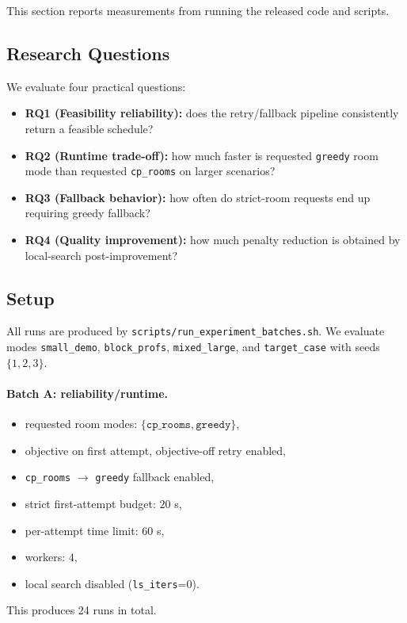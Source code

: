This section reports measurements from running the released code and scripts.

\subsection{Research Questions}
We evaluate four practical questions:
\begin{itemize}[leftmargin=*]
  \item \textbf{RQ1 (Feasibility reliability):} does the retry/fallback pipeline consistently return a feasible schedule?
  \item \textbf{RQ2 (Runtime trade-off):} how much faster is requested \texttt{greedy} room mode than requested \texttt{cp\_rooms} on larger scenarios?
  \item \textbf{RQ3 (Fallback behavior):} how often do strict-room requests end up requiring greedy fallback?
  \item \textbf{RQ4 (Quality improvement):} how much penalty reduction is obtained by local-search post-improvement?
\end{itemize}

\subsection{Setup}
All runs are produced by \texttt{scripts/run\_experiment\_batches.sh}.
We evaluate modes \texttt{small\_demo}, \texttt{block\_profs}, \texttt{mixed\_large}, and \texttt{target\_case}
with seeds \(\{1,2,3\}\).

\paragraph{Batch A: reliability/runtime.}
\begin{itemize}[leftmargin=*]
  \item requested room modes: \(\{\texttt{cp\_rooms}, \texttt{greedy}\}\),
  \item objective on first attempt, objective-off retry enabled,
  \item \texttt{cp\_rooms} \(\rightarrow\) \texttt{greedy} fallback enabled,
  \item strict first-attempt budget: \(20\) s,
  \item per-attempt time limit: \(60\) s,
  \item workers: \(4\),
  \item local search disabled (\texttt{ls\_iters}=0).
\end{itemize}
This produces 24 runs in total.

